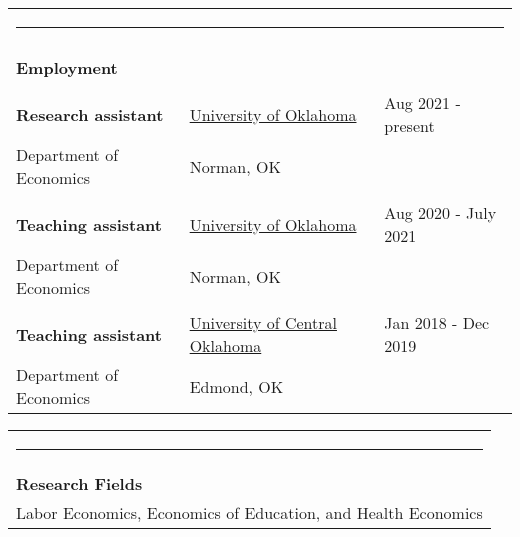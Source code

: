 \documentclass[10pt,letterpaper]{article}
\begin{document}
\begin{tabular}{p{2.75in}p{3.05in}p{4.0in}}
\multicolumn{3}{p{7.5in}}{\hrule}\\
\\
{\textbf{\large{Employment}}} & &\\
\\
\textbf{Research assistant} & \href{http://www.ou.edu/}{University of Oklahoma}& Aug 2021 - present\\
Department of Economics      & Norman, OK &\\
\\
\textbf{Teaching assistant} & \href{http://www.ou.edu/}{University of Oklahoma}& Aug 2020 - July 2021\\
Department of Economics      & Norman, OK &\\
\\
\textbf{Teaching assistant} & \href{https://www.uco.edu/}{University of Central Oklahoma}& Jan 2018 - Dec 2019\\
Department of Economics      & Edmond,  OK &\\

\end{tabular} 



\begin{tabular}{p{7.5in}}
\multicolumn{3}{p{7.5in}}{\hrule}\\[1.5ex]
{\textbf{\large{Research Fields}}} \\[1ex]
Labor Economics,  Economics of Education,  and Health Economics
\multicolumn{3}{p{7.5in}}{\hrule}
\end{tabular} 
\end{document}
